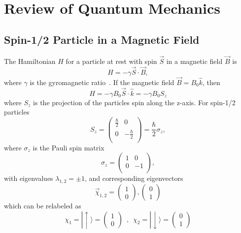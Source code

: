 \chapter{Review of Quantum Mechanics\label{chap:qm}}

\section{Spin-1/2 Particle in a Magnetic Field}

The Hamiltonian $H$ for a particle at rest with spin $\vec{S}$ in a magnetic
field $\vec{B}$ is
%
\begin{equation}
H = - \gamma \vec{S} \cdot \vec{B},
\end{equation}
%
where $\gamma$ is the gyromagnetic ratio~\cite{NMR_Notes}.
If the magnetic field $\vec{B} = B_{0} \hat{k}$, then
%
\begin{equation}
H = - \gamma B_{0} \vec{S} \cdot \hat{k} = - \gamma B_{0} S_{z}
\end{equation}
%
where $S_{z}$ is the projection of the particles spin along the
z-axis.
%
For spin-1/2 particles
%
\[ S_{z} = \left( \begin{array}{cc}
\frac{\hbar}{2} & 0  \\
0 & -\frac{\hbar}{2} \\
\end{array} \right) = \frac{\hbar}{2} \sigma_{z} ,\]
%
where $\sigma_{z}$ is the Pauli spin matrix
%
\[ \sigma_{z} = \left( \begin{array}{cc}
1 & 0  \\
0 & -1 \\
\end{array} \right) ,\]
%
with eigenvalues $ \lambda_{1,2} = \pm 1$, and corresponding
eigenvectors
\begin{equation}
    \vec{\chi}_{1,2} = 
    \begin{pmatrix}
        1 \\
        0
     \end{pmatrix} ,
    \begin{pmatrix}
        0 \\
        1
    \end{pmatrix}
\end{equation}
which can be relabeled as
\begin{equation}
   \chi_{1} = |\uparrow\rangle = 
    \begin{pmatrix}
        1 \\
        0
     \end{pmatrix} \,\,\, ,  \,\,\,   
    \chi_{2} = |\downarrow\rangle = 
    \begin{pmatrix}
        0 \\
        1
     \end{pmatrix}
\end{equation}
